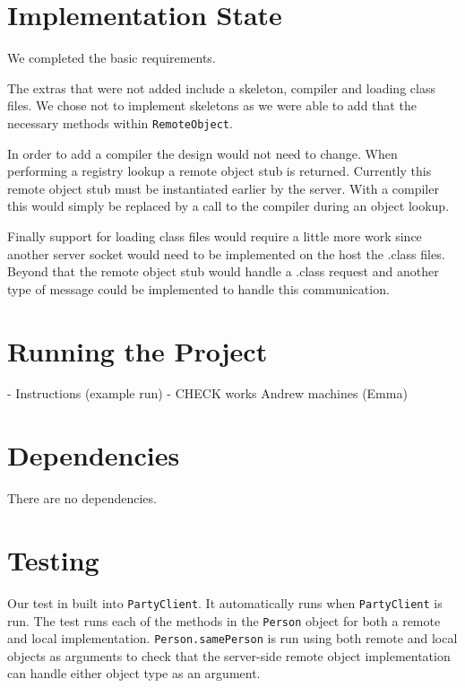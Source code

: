 \documentclass[12pt]{article}
\begin{document}

\section{Implementation State}

We completed the basic requirements.

The extras that were not added include a skeleton, compiler and loading class files. We chose not to implement skeletons as we were able to add that the necessary methods within \texttt{RemoteObject}.

In order to add a compiler the design would not need to change. When performing a registry lookup a remote object stub is returned. Currently this remote object stub must be instantiated earlier by the server. With a compiler this would simply be replaced by a call to the compiler during an object lookup.

Finally support for loading class files would require a little more work since another server socket would need to be implemented on the host the .class files. Beyond that the remote object stub would handle a .class request and another type of message could be implemented to handle this communication.


\section{Running the Project}

- Instructions (example run)
- CHECK works Andrew machines
(Emma)


\section{Dependencies}

There are no dependencies.


\section{Testing}

Our test in built into \texttt{PartyClient}. It automatically runs when \texttt{PartyClient} is run. The test runs each of the methods in the \texttt{Person} object for both a remote and local implementation. \texttt{Person.samePerson} is run using both remote and local objects as arguments to check that the server-side remote object implementation can handle either object type as an argument.
\end{document}
